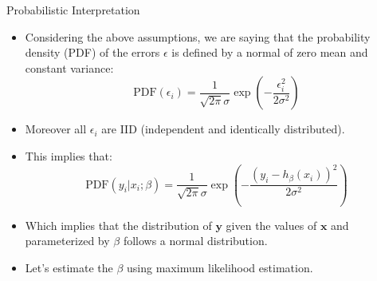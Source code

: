 \documentclass[handout]{beamer}
\begin{document}
\begin{frame}{Probabilistic Interpretation}
\scriptsize{
\begin{itemize}
 \item Considering the above assumptions, we are saying that the probability density (PDF) of the errors $\epsilon$ is defined by a normal of zero mean and constant variance:
 \begin{displaymath}
  \text{PDF}(\epsilon_{i})=\frac{1}{\sqrt{2\pi} \sigma} \exp \left(- \frac{\epsilon_{i}^{2}}{2\sigma^2}\right)
 \end{displaymath}
 \item Moreover all $\epsilon_{i}$ are IID (independent and identically distributed).
 \item This implies that:
  \begin{displaymath}
  \text{PDF}(y_i|x_{i};\beta)=\frac{1}{\sqrt{2\pi} \sigma} \exp \left(- \frac{(y_i - h_{\beta}(x_{i}) )^{2}}{2\sigma^2}\right)
 \end{displaymath}
\item Which implies that the distribution of $\mathbf{y}$ given the values of $\mathbf{x}$ and parameterized by $\beta$ follows a normal distribution.

\item Let's estimate the $\beta$ using maximum likelihood estimation.

\end{itemize}

}
 
\end{frame}
\end{document}
